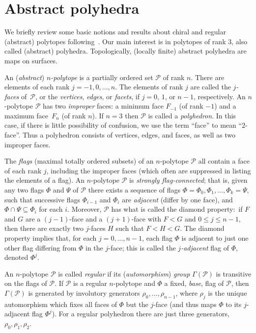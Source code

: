 \documentclass[12pt]{article}
\theoremstyle{definition}\newtheorem{definition}{Definition}[section]
\begin{document}
\section{Abstract polyhedra}
\label{abpo}

We briefly review some basic notions and results about chiral and regular (abstract) polytopes following~\cite{McMSch2002,Pel2025,SchWei1991}. Our main interest is in polytopes of rank $3$, also called (abstract) polyhedra. Topologically, (locally finite) abstract polyhedra are maps on surfaces.
\smallskip
 
An ({\em abstract\/}) {\em $n$-polytope\/} is a partially ordered set $\mathcal{P}$ of rank $n$. There are elements of each rank $j=-1,0,\ldots,n$. The elements of rank $j$ are called the {\em $j$-faces\/} of~$\mathcal{P}$, or the {\em vertices}, {\em edges\/}, or {\em facets\/}, if $j = 0$, $1$, or $n-1$, respectively. An $n$-polytope $\mathcal{P}$ has two \textit{improper} faces: a minimum face $F_{-1}$ (of rank $-1$) and a maximum face~$F_n$ (of rank $n$). If $n=3$ then $\mathcal{P}$ is called a {\em polyhedron\/}. In this case, if there is little possibility of confusion, we use the term ``face'' to mean ``$2$-face''. Thus a polyhedron consists of vertices, edges, and faces, as well as two improper faces.

The \textit{flags} (maximal totally ordered subsets) of an $n$-polytope $\mathcal{P}$ all contain a face of each rank $j$, including the improper faces (which often are suppressed in listing the elements of a flag). An $n$-polytope $\mathcal{P}$ is \textit{strongly flag-connected\/}; that is, given any two flags $\Phi$ and $\Psi$ of $\mathcal{P}$ there exists a sequence of flags $\Phi = \Phi_{0},\Phi_{1},\ldots,\Phi_{k} =\Psi$, such that successive flags $\Phi_{i-1}$ and $\Phi_{i}$ are {\em adjacent\/} (differ by one face), and $\Phi \cap\Psi \subseteq \Phi_{i}$ for each $i$. Moreover, $\mathcal{P}$ has what is called the diamond property:\ if $F$ and $G$ are a $(j-1)$-face and a $(j+1)$-face with $F < G$ and $0\leq j\leq n-1$, then there are exactly two $j$-faces $H$ such that $F < H < G$. The diamond property implies that, for each $j=0,\ldots,n-1$, each flag $\Phi$ is adjacent to just one other flag differing from $\Phi$ in the $j$-face; this is called the \textit{$j$-adjacent\/} flag of $\Phi$, denoted $\Phi^j$.
\smallskip

An $n$-polytope $\mathcal{P}$ is called {\em regular\/} if its ({\em automorphism\/}) {\em group\/} $\Gamma(\mathcal{P})$ is transitive on the flags of $\mathcal{P}$. If $\mathcal{P}$ is a regular $n$-polytope and $\Phi$ a fixed, {\em base\/}, flag of $\mathcal{P}$, then $\Gamma(\mathcal{P})$ is generated by involutory generators $\rho_{0},\dots,\rho_{n-1}$, where $\rho_{j}$ is the unique automorphism which fixes all faces of $\Phi$ but the $j$-face (and thus maps $\Phi$ to its $j$-adjacent flag $\Phi^j$). For a regular polyhedron there are just three generators, $\rho_{0},\rho_{1},\rho_{2}$. \smallskip
\end{document}
